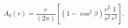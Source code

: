 \begin{equation}
A_{0}(r)=\frac{e}{(2\pi)}\left[  \left(  1-\cos^{2}\beta\right)  \frac{v^{2}%
}{s^{2}}\frac{1}{r^{2}}\right]  ,
\end{equation}

